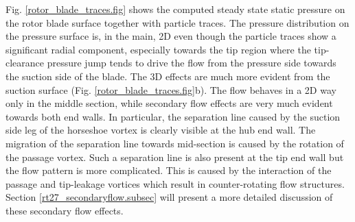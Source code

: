 %
 Fig. \ref{rotor_blade_traces.fig} shows the computed steady state static
 pressure on the rotor blade surface together with particle traces.
 The pressure distribution on the pressure surface is, in the main,
 2D even though the particle traces
 show a significant radial component, especially towards the tip region
 where the tip-clearance pressure jump tends to drive the flow from the pressure
 side towards the suction side of the blade.
 The 3D effects are much more evident from the suction
 surface (Fig. \ref{rotor_blade_traces.fig}b). The flow behaves in a
 2D way only in the middle section, while
 secondary flow effects are very much evident towards both end walls.
 In particular, the separation line caused by the suction side
 leg of the horseshoe vortex is clearly visible at the hub end wall.
 The migration of the separation line
 towards mid-section is caused by the rotation of the passage vortex.
 Such a separation line is also present at the tip end wall but
 the flow pattern is more complicated.
 This is caused by the interaction of the passage and tip-leakage
 vortices which result in counter-rotating flow structures.
 Section \ref{rt27_secondaryflow.subsec} will present a more detailed
 discussion of these secondary flow effects.

